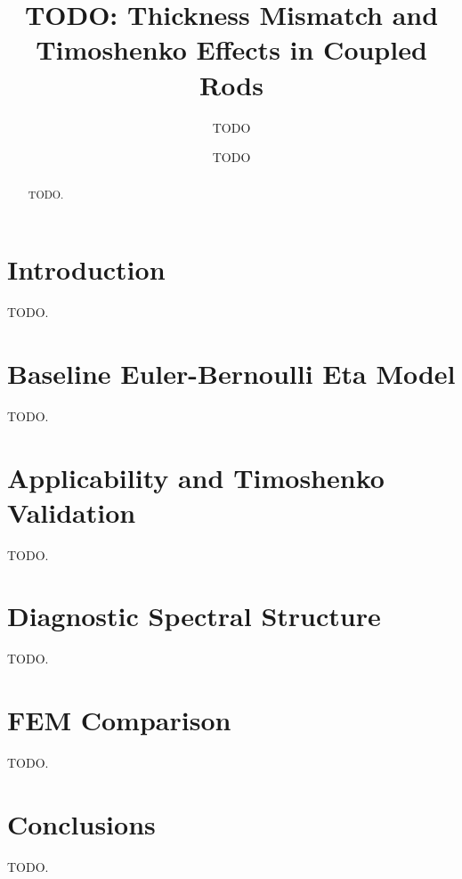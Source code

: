 \documentclass[12pt]{article}
\title{TODO: Thickness Mismatch and Timoshenko Effects in Coupled Rods}
\author{TODO}
\date{TODO}
\begin{document}
\maketitle

\begin{abstract}
TODO.
\end{abstract}

\section{Introduction}
TODO.

\section{Baseline Euler-Bernoulli Eta Model}
TODO.

\section{Applicability and Timoshenko Validation}
TODO.

\section{Diagnostic Spectral Structure}
TODO.

\section{FEM Comparison}
TODO.

\section{Conclusions}
TODO.

\end{document}
